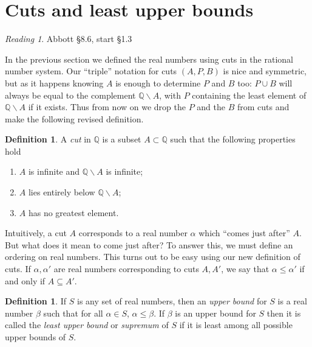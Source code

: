 \documentclass[11pt,oneside]{amsbook}
\newcommand{\Q}{\mathbb Q}
\renewcommand{\setminus}{\smallsetminus}
\theoremstyle{definition}
\theoremstyle{plain}
\theoremstyle{definition}
\newtheorem{definition}[theorem]{Definition}
\theoremstyle{remark}
\newtheorem*{reading}{Reading}
\numberwithin{equation}{section}
\numberwithin{figure}{section}
\begin{document}
\newpage
\section{Cuts and least upper bounds}

\begin{reading}
  Abbott \S 8.6, start \S 1.3
\end{reading}

In the previous section we defined the real numbers using cuts in the rational number system. Our ``triple'' notation for cuts $(A,P,B)$ is nice and symmetric, but as it happens knowing $A$ is enough to determine $P$ and $B$ too: $P\cup B$ will always be equal to the complement $\Q\setminus A$, with $P$ containing the least element of $\Q\setminus A$ if it exists. Thus from now on we drop the $P$ and the $B$ from cuts and make the following revised definition.

\begin{definition}
  A \emph{cut} in $\Q$ is a subset $A\subset\Q$ such that the following properties hold
  \begin{enumerate}
  \item $A$ is infinite and $\Q\setminus A$ is infinite;
  \item $A$ lies entirely below $\Q\setminus A$;
  \item $A$ has no greatest element.
  \end{enumerate}
\end{definition}

Intuitively, a cut $A$ corresponds to a real number $\alpha$ which ``comes just after'' $A$. But what does it mean to come just after? To answer this, we must define an ordering on real numbers. This turns out to be easy using our new definition of cuts. If $\alpha,\alpha'$ are real numbers corresponding to cuts $A,A'$, we say that $\alpha\leq\alpha'$ if and only if $A\subseteq A'$.

\begin{definition}
  If $S$ is any set of real numbers, then an \emph{upper bound} for $S$ is a real number $\beta$ such that for all $\alpha\in S$, $\alpha\leq\beta$. If $\beta$ is an upper bound for $S$ then it is called the \emph{least upper bound} or \emph{supremum} of $S$ if it is least among all possible upper bounds of $S$.
\end{definition}
\end{document}
